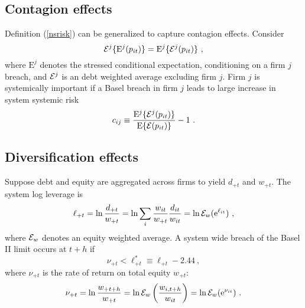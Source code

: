 \documentclass[authoryear]{elsarticle}
\newcommand{\E}{\mathrm{E}}
\newcommand{\e}{\mathrm{e}}
\newcommand{\Ex}{{\cal E}}
\newcommand{\eref}[1]{(\ref{#1})}
\newcommand{\be}[1]{\begin{equation}\label{#1}}
\newcommand{\ee}{\end{equation}}
\begin{document}
\begin{comment}
\subsection{Weihao - Allocating the market put}

The overall market shortfall after allowing for diversification between firms is
$$
p_{mt}\equiv k_+ |1-\e^{-\ell^*_{mt}+\nu_{mt}}|^+
= k_+|\Ex (1-\e^{-\ell^*_{it}+\nu_{it}})|^+
=I(\nu_{mt}<\ell_{mt}^*)k_+\Ex(1-\e^{-\ell^*_{it}+\nu_{it}}) 
$$
and hence the portion attributable to firm $i$ is $k_i(1-\e^{-\ell^*_{it}+\nu_{it}}) I(\nu_{mt}<\ell_{mt}^*)$, its capital shortfall or surplus when the overall market is in a shortfall. The allocation of the stressed expectation $\E(p_{mt})$ is then
$$
k_i\E\{(1-\e^{-\ell^*_{it}+\nu_{it}}) I(\nu_{mt}<\ell_{mt}^*)\}
$$
and applying $\Ex$ to the above expression yields $\E(p_{mt})$.
\end{comment}





\subsection{Contagion effects}
Definition \eref{nsrisk} can be generalized to capture contagion effects.  Consider 
\be{cont}
\Ex^j\{\E^j(p_{it})\}=\E^j\{\Ex^j(p_{it})\}\ ,
\ee
where  $\E^j$ denotes the stressed conditional expectation, conditioning on a firm $j$ breach, and $\Ex^j$ is an debt weighted average excluding firm $j$.  Firm $j$ is systemically important  if a Basel breach in firm $j$ leads to large increase in system systemic risk
$$
c_{ij}\equiv \frac{\E^j\{\Ex^j(p_{it})\}}{\E\{\Ex(p_{it})\}}-1\ .
$$

\subsection{Diversification effects} 

Suppose debt and equity are  aggregated across firms to yield $d_{+t}$ and $w_{+t}$.  The system log leverage is  
$$
\ell_{+t} =  \ln \frac{d_{+t}}{w_{+t}} =  \ln \sum_i\frac{w_{it}}{w_{+t}}\frac{ d_{it}}{ w_{it}} = \ln \Ex_w(\e^{\ell_{it}}) \ ,
$$
where $\Ex_w$ denotes an equity weighted average.  A system wide breach of the Basel II limit occurs at $t+h$ if
$$
\nu_{+t} < \ell_{+t}^*\equiv \ell_{+t} - 2.44 \ ,
$$
where $\nu_{+t}$ is the rate of return on total equity $w_{+t}$:
\be{ew}
 \nu_{+t} = \ln \frac{w_{+t+h}}{w_{+t}} = \ln \Ex_w\left(\frac{w_{i,t+h}}{w_{it}}\right) = \ln \Ex_w(\e^{\nu_{it}})\ . 
\ee
\end{document}
